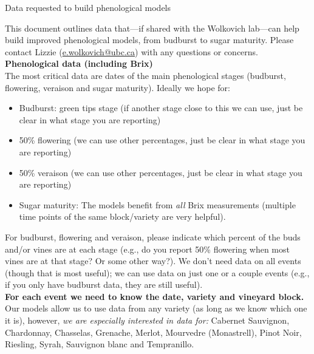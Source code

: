 \documentclass[11pt,letter]{article}
\newenvironment{smitemize}{
\begin{itemize}
  \setlength{\itemsep}{1pt}
  \setlength{\parskip}{0pt}
  \setlength{\parsep}{0pt}}
{\end{itemize}
}
\begin{document}

\renewcommand{\refname}{\CHead{}}

\begin{center}
{\Large Data requested to build phenological models}
\end{center}
This document outlines data that---if shared with the Wolkovich lab---can help build improved phenological models, from budburst to sugar maturity. Please contact Lizzie (\url{e.wolkovich@ubc.ca}) with any questions or concerns.\\

{\bf Phenological data (including Brix)}\\

The most critical data are dates of the main phenological stages (budburst, flowering, veraison and sugar maturity). Ideally we hope for:
\begin{smitemize}
\item Budburst: green tips stage (if another stage close to this we can use, just be clear in what stage you are reporting)
\item 50\% flowering (we can use other percentages, just be clear in what stage you are reporting)
\item 50\% veraison (we can use other percentages, just be clear in what stage you are reporting)
\item Sugar maturity: The models benefit from \emph{all} Brix measurements (multiple time points of the same block/variety are very helpful). 
\end{smitemize}
For budburst, flowering and veraison, please indicate which percent of the buds and/or vines are at each stage (e.g., do you report 50\% flowering when most vines are at that stage? Or some other way?). We don't need data on all events (though that is most useful); we can use data on just one or a couple events (e.g., if you only have budburst data, they are still useful). 
\vspace{2ex}\\
{\bf For each event we need to know the date, variety and vineyard block.}
\vspace{2ex}\\
Our models allow us to use data from any variety (as long as we know which one it is), however, \emph{we are especially interested in data for:} Cabernet Sauvignon, Chardonnay, Chasselas, Grenache, Merlot, Mourvedre (Monastrell), Pinot Noir, Riesling, Syrah, Sauvignon blanc and Tempranillo.\\
\end{document}
